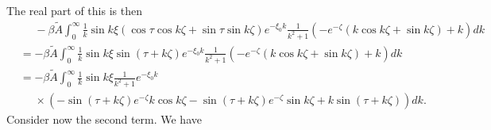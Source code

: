 \documentclass[12pt]{article}
\begin{document}
The real part of this is then
\begin{align}
&\phantom{=} -\beta \tilde{A}  \int_0^\infty \frac{1}{k} \sin k\xi \left(\cos\tau \cos k\zeta  + \sin\tau \sin k\zeta\right) e^{-\xi_0 k}   \frac{1}{k^2+1}\left(-e^{-\zeta}\left(k\cos k\zeta + \sin k\zeta \right) + k \right) dk \\
&= -\beta \tilde{A}  \int_0^\infty \frac{1}{k} \sin k\xi \sin\left(\tau + k\zeta\right) e^{-\xi_0 k}   \frac{1}{k^2+1}\left(-e^{-\zeta}\left(k\cos k\zeta + \sin k\zeta \right) + k \right) dk \\
& = -\beta \tilde{A}  \int_0^\infty \frac{1}{k} \sin k\xi \frac{1}{k^2+1} e^{-\xi_0 k} \\
&\phantom{=} \times \left(-\sin\left(\tau+k\zeta\right)e^{-\zeta}k\cos k\zeta - \sin\left(\tau+k\zeta\right) e^{-\zeta} \sin k\zeta + k\sin\left(\tau+k\zeta\right) \right) dk. \label{Eq:realTermOne} 
\end{align}
Consider now the second term. We have
\end{document}
